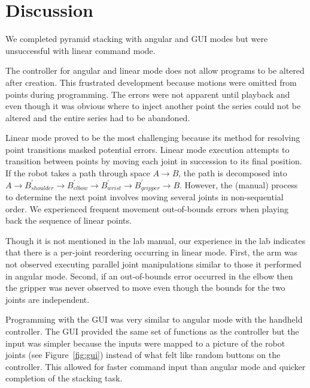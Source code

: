 \section{Discussion}\label{sec:discussion}
We completed pyramid stacking with angular and GUI modes but were unsuccessful with linear command mode.

The controller for angular and linear mode does not allow programs to be altered after creation.
This frustrated development because motions were omitted from points during programming.
The errors were not apparent until playback and even though it was obvious where to inject another point the series could not be altered and the entire series had to be abandoned.

Linear mode proved to be the most challenging because its method for resolving point transitions masked potential errors.
Linear mode execution attempts to transition between points by moving each joint in succession to its final position.
If the robot takes a path through space $A \rightarrow B$, the path is decomposed into $A \rightarrow B^{\prime}_{shoulder} \rightarrow B^{\prime}_{elbow} \rightarrow B^{\prime}_{wrist} \rightarrow B^{\prime}_{gripper} \rightarrow B$.
However, the (manual) process to determine the next point involves moving several joints in non-sequential order.
We experienced frequent movement out-of-bounds errors when playing back the sequence of linear points.

Though it is not mentioned in the lab manual, our experience in the lab indicates that there is a per-joint reordering occurring in linear mode.
First, the arm was not observed executing parallel joint manipulations similar to those it performed in angular mode.
Second, if an out-of-bounds error occurred in the elbow then the gripper was never observed to move even though the bounds for the two joints are independent.

Programming with the GUI was very similar to angular mode with the handheld controller.
The GUI provided the same set of functions as the controller but the input was simpler because the inputs were mapped to a picture of the robot joints (see Figure~\ref{fig:gui}) instead of what felt like random buttons on the controller.
This allowed for faster command input than angular mode and quicker completion of the stacking task.

